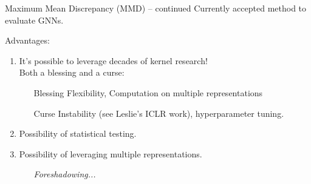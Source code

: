 \documentclass[aspectratio=169, 10pt, dvipsnames]{beamer}
\begin{document}
\begin{frame}[fragile]{Maximum Mean Discrepancy (MMD) -- continued}
  \pause\small Currently accepted method to evaluate GNNs.

  \pause Advantages:
  \begin{enumerate}
    \pause\item \small It's possible to leverage decades of kernel research!\\ Both a
    \textcolor{PineGreen}{blessing} and a \textcolor{YellowOrange}{curse}:
    \begin{itemize}
      \pause\item[\textcolor{PineGreen}{Blessing}] Flexibility, Computation on
      multiple representations
      \pause\item[\textcolor{YellowOrange}{Curse}] Instability (see Leslie's ICLR work), hyperparameter tuning.
    \end{itemize}
  \pause\item \small Possibility of statistical testing.
  \pause\item \small Possibility of leveraging multiple representations.
    \begin{itemize}
      \pause\item[] \emph{Foreshadowing...}
    \end{itemize}
  \end{enumerate}
\end{frame}
\end{document}
